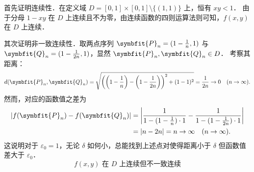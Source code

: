 \begin{myproof}
    首先证明连续性．在定义域 $D = [0,1] \times [0,1] \setminus \{(1,1)\}$ 上，恒有 $xy < 1$．
    由于分母 $1-xy$ 在 $D$ 上连续且不为零，由连续函数的四则运算法则可知，$f(x,y)$ 在 $D$ 上连续．

    其次证明非一致连续性．取两点序列 $\symbfit{P}_n = (1 - \frac{1}{n}, 1)$ 与 $\symbfit{Q}_n = (1 - \frac{1}{2n}, 1)$，显然 $\symbfit{P}_n, \symbfit{Q}_n \in D$．
    考察其距离：
    \begin{equation}
        d(\symbfit{P}_n, \symbfit{Q}_n) = \sqrt{\left( \left( 1 - \frac{1}{n} \right) - \left( 1 - \frac{1}{2n} \right) \right)^2 + (1-1)^2} = \frac{1}{2n} \to 0 \quad (n \to \infty).
    \end{equation}
    然而，对应的函数值之差为
    \begin{equation}
        \begin{aligned}
            |f(\symbfit{P}_n) - f(\symbfit{Q}_n)| & = \left| \frac{1}{1 - (1 - \frac{1}{n}) \cdot 1} - \frac{1}{1 - (1 - \frac{1}{2n}) \cdot 1} \right| \\
                                                  & = |n - 2n| = n \to \infty \quad (n \to \infty).
        \end{aligned}
    \end{equation}
    这说明对于 $\varepsilon_0 = 1$，无论 $\delta$ 如何小，总能找到上述点对使得距离小于 $\delta$ 但函数值差大于 $\varepsilon_0$．
    \begin{equation}
        \boxed{f(x,y) \text{ 在 } D \text{ 上连续但不一致连续}}
    \end{equation}
\end{myproof}

\endinput
